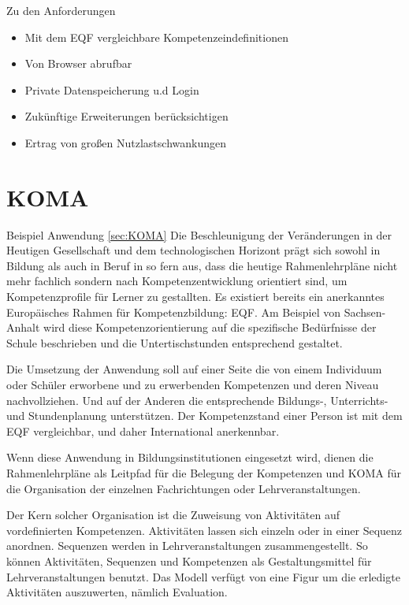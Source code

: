 \documentclass[
12pt,
english,
ngerman,
headsepline,
twoside,
openright,
numbers=noenddot,version=first
]{scrreprt}
\begin{document}
Zu den Anforderungen
\begin{itemize}
	\item Mit dem EQF vergleichbare Kompetenzeindefinitionen
	\item Von Browser abrufbar
	\item Private Datenspeicherung u.d Login
	\item Zukünftige Erweiterungen berücksichtigen
	\item Ertrag von großen Nutzlastschwankungen
\end{itemize}


\section{KOMA}{Beispiel Anwendung}
\label{sec:KOMA} \autoref{sec:KOMA}
Die Beschleunigung der Veränderungen in der Heutigen Gesellschaft und dem technologischen Horizont prägt sich sowohl in Bildung als auch in Beruf in so fern aus, dass die heutige Rahmenlehrpläne nicht mehr fachlich sondern nach Kompetenzentwicklung orientiert sind, um Kompetenzprofile für Lerner zu gestallten. Es existiert bereits ein anerkanntes Europäisches Rahmen für Kompetenzbildung: \acrfull{EQF}. Am Beispiel von Sachsen-Anhalt\cite{BildungsServerSachsen} wird diese Kompetenzorientierung auf die spezifische Bedürfnisse der Schule beschrieben und die Untertischstunden entsprechend gestaltet.

Die Umsetzung der Anwendung soll auf einer Seite die von einem Individuum oder Schüler
erworbene und zu erwerbenden Kompetenzen und deren Niveau nachvollziehen. Und auf der Anderen die entsprechende Bildungs-, Unterrichts- und Stundenplanung unterstützen.
Der Kompetenzstand einer Person ist mit dem \acrshort{EQF} vergleichbar, und daher International anerkennbar.

Wenn diese Anwendung in Bildungsinstitutionen eingesetzt wird, dienen die Rahmenlehrpläne als Leitpfad für die Belegung der Kompetenzen und \acrshort{KOMA} für die Organisation der einzelnen Fachrichtungen oder Lehrveranstaltungen. 

Der Kern solcher Organisation ist die Zuweisung von Aktivitäten auf vordefinierten Kompetenzen. Aktivitäten lassen sich einzeln oder in einer Sequenz anordnen. Sequenzen werden in Lehrveranstaltungen zusammengestellt. So können Aktivitäten, Sequenzen und Kompetenzen
als Gestaltungsmittel für Lehrveranstaltungen benutzt. Das Modell verfügt von eine Figur um die erledigte Aktivitäten auszuwerten, nämlich Evaluation.
\end{document}
